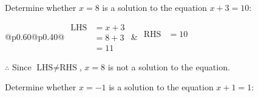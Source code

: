 \documentclass[12pt]{article}
\newcounter{minipagecount}
\begin{document}
\begin{multicols}{2}
\begin{minipage}[t]{0.40\textwidth}
    \noindent Determine whether \(x = 8\) is a solution to the equation \(x + 3 = 10\):
    \vspace{2pt}  %

    \noindent
    \renewcommand{\arraystretch}{1.3} %
    \begin{tabular}{@{}p{0.60\linewidth}@{}p{0.40\linewidth}@{}}
        \(\begin{aligned}
            \text{LHS} &= x + 3 \\
                    &= 8 + 3 \\
                    &= 11 
        \end{aligned}\) &
        \(\begin{aligned}
            \text{RHS} &= 10\\
                    & \\
                    &
        \end{aligned}\)
    \end{tabular}
    \renewcommand{\arraystretch}{1.0} %
    \vspace{2pt}  %

    \noindent \(\therefore\) Since \(\text{LHS} \neq \text{RHS}\), \(x = 8\) is not  a solution to the equation.

\end{minipage}

\vspace*{0.5ex}
\vfill{}
\noindent{(\theminipagecount)}\hspace{0.1mm} %
\begin{minipage}[t]{0.40\textwidth} %

    \noindent Determine whether \(x = -1\) is a solution to the equation \(x + 1 = 1\):
    \vspace{2pt}  %


\end{minipage}
\end{multicols}
\end{document}
